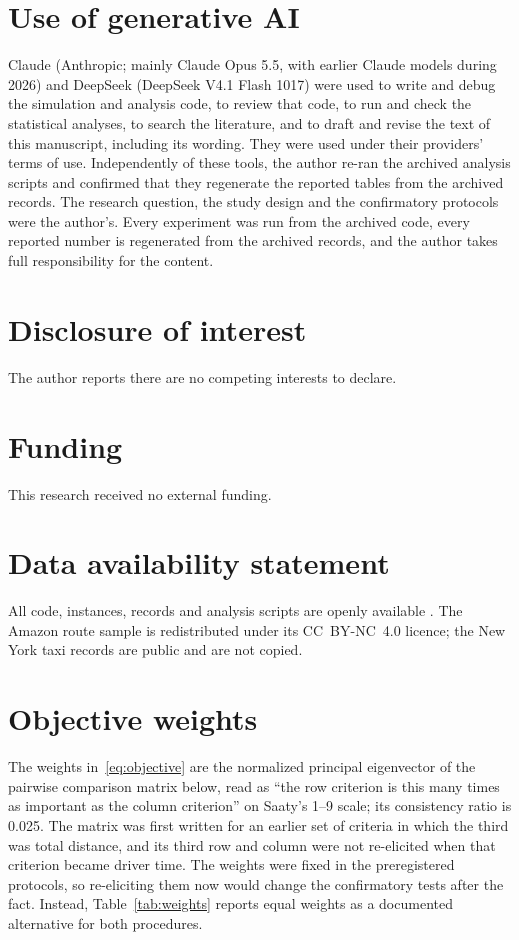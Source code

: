 \documentclass[11pt,a4paper]{article}
\theoremstyle{remark}
\newcommand{\refsfile}{ijss_refs}
\begin{document}
\section*{Use of generative AI}
Claude (Anthropic; mainly Claude Opus 5.5, with earlier Claude models during 2026)
and DeepSeek (DeepSeek V4.1 Flash 1017) were used to write and debug the
simulation and analysis code, to review that code, to run and check the statistical
analyses, to search the literature, and to draft and revise the text of this
manuscript, including its wording. They were used under their providers' terms of
use. Independently of these tools, the author re-ran the archived analysis scripts and
confirmed that they regenerate the reported tables from the archived records. The research question, the study design and the confirmatory protocols were
the author's. Every experiment was run from the archived code, every reported
number is regenerated from the archived records, and the author takes full
responsibility for the content.

\section*{Disclosure of interest}
The author reports there are no competing interests to declare.

\section*{Funding}
This research received no external funding.

\section*{Data availability statement}

All code, instances, records and analysis scripts are openly available
\citep{ali2026archive}. The Amazon route sample is redistributed under its
CC~BY-NC~4.0 licence; the New York taxi records are public and are not copied.





\appendix
\setcounter{table}{0}
\renewcommand{\thetable}{\thesection\arabic{table}}
\section{Objective weights}\label{app:weights}

The weights in~\eqref{eq:objective} are the normalized principal eigenvector of the
pairwise comparison matrix below, read as ``the row criterion is this many times as
important as the column criterion'' on Saaty's 1--9 scale; its consistency ratio is
0.025. The matrix was first written for an earlier set of criteria in which the third
was total distance, and its third row and column were not re-elicited when that
criterion became driver time. The weights were fixed in the preregistered protocols, so
re-eliciting them now would change the confirmatory tests after the fact. Instead,
Table~\ref{tab:weights} reports equal weights as a documented alternative for both
procedures.
\end{document}
